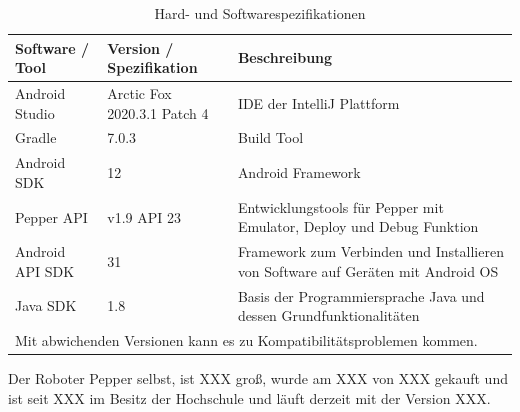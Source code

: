 \begin{table}[H]
    \caption{Hard- und Softwarespezifikationen}
    \label{table}
    \setlength{\tabcolsep}{3pt}
    \begin{tabular}{|p{100pt}|p{120pt}|p{180pt}|}
        \hline
        Software / Tool & Version / Spezifikation     & Beschreibung                                                                     \\
        \hline\hline
        Android Studio  & Arctic Fox 2020.3.1 Patch 4 & IDE der IntelliJ Plattform                                                       \\
        \hline
        Gradle          & 7.0.3                       & Build Tool                                                                       \\
        \hline
        Android SDK     & 12                          & Android Framework                                                                \\
        \hline
        Pepper API      & v1.9  API 23                & Entwicklungstools für Pepper mit Emulator, Deploy und Debug Funktion             \\
        \hline
        Android API SDK & 31                          & Framework zum Verbinden und Installieren von Software auf Geräten mit Android OS \\
        \hline
        Java SDK        & 1.8                         & Basis der Programmiersprache Java und dessen Grundfunktionalitäten               \\
        \hline
        \multicolumn{3}{p{380pt}}{Mit abwichenden Versionen kann es zu Kompatibilitätsproblemen kommen.}
    \end{tabular}
    \label{tab1}
\end{table} 


Der Roboter Pepper selbst, ist XXX groß, wurde am XXX von XXX gekauft und ist seit XXX im Besitz der Hochschule
und läuft derzeit mit der Version XXX.


